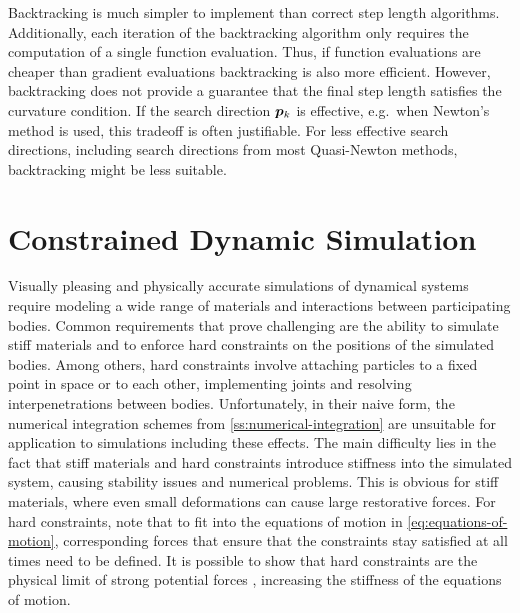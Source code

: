 Backtracking is much simpler to implement than correct step length algorithms. Additionally, each iteration of the backtracking algorithm
only requires the computation of a single function evaluation. Thus, if function evaluations are cheaper than gradient evaluations 
backtracking is also more efficient. However, backtracking does not provide a guarantee that the final step length satisfies the curvature
condition. If the search direction $\bm{p}_k$ is effective, e.g.\ when Newton's method is used, this tradeoff is often justifiable. 
For less effective search directions, including search directions from most Quasi-Newton methods, backtracking might be less suitable.

\section{Constrained Dynamic Simulation}\label{s:dynamic-simulation}
Visually pleasing and physically accurate simulations of dynamical systems require modeling a wide range of materials and 
interactions between participating bodies. Common requirements that prove challenging are the ability to simulate stiff materials
and to enforce hard constraints on the positions of the simulated bodies. Among others, hard constraints involve attaching particles
to a fixed point in space or to each other, implementing joints and resolving interpenetrations between bodies. Unfortunately, in their 
naive form, the numerical integration schemes from \cref{ss:numerical-integration} are unsuitable for application to simulations 
including these effects. The main difficulty lies in the fact that stiff materials and hard constraints introduce stiffness into 
the simulated system, causing stability issues and numerical problems. This is obvious for stiff materials, where even small 
deformations can cause large restorative forces. For hard constraints, note that to fit into the equations of motion in 
\autoref{eq:equations-of-motion}, corresponding forces that ensure that the constraints stay satisfied at all times need to be defined. 
It is possible to show that hard constraints are the physical limit of strong potential forces \cite{servin2006}, increasing the 
stiffness of the equations of motion. 

